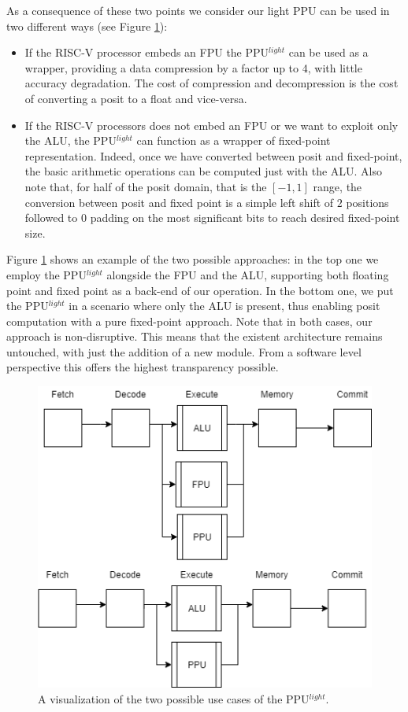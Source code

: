 As a consequence of these two points we consider our light PPU can be used in two different ways (see Figure \ref{fig:use_cases}):
\begin{itemize}
    \item If the RISC-V processor embeds an FPU the PPU$^{light}$ can be used as a wrapper, providing a data compression by a factor up to 4, with little accuracy degradation. The cost of compression and decompression is the cost of converting a posit to a float and vice-versa.
    \item If the RISC-V processors does not embed an FPU or we want to exploit only the ALU, the PPU$^{light}$ can function as a wrapper of fixed-point representation. Indeed, once we have converted between posit and fixed-point, the basic arithmetic operations can be computed just with the ALU. Also note that, for half of the posit domain, that is the $[-1,1]$ range, the conversion between posit and fixed point is a simple left shift of $2$ positions followed to $0$ padding on the most significant bits to reach desired fixed-point size.
\end{itemize}

Figure \ref{fig:use_cases} shows an example of the two possible approaches: in the top one we employ the PPU$^{light}$ alongside the  FPU  and  the  ALU,  supporting  both  floating  point  and fixed  point  as  a  back-end  of  our  operation.  In  the  bottom one, we put the  PPU$^{light}$ in a scenario where only the ALU is present, thus enabling posit computation with a pure fixed-point approach. Note that in both cases, our approach is non-disruptive. This means that the existent architecture remains untouched, with just the addition of a new module. From a software level perspective this offers the highest transparency possible.


\begin{figure}
    \centering
    \includegraphics[width=0.5\linewidth]{img/use_cases.png}
    \caption{A visualization of the two possible use cases of the PPU$^{light}$. }
    \label{fig:use_cases}
\end{figure}


